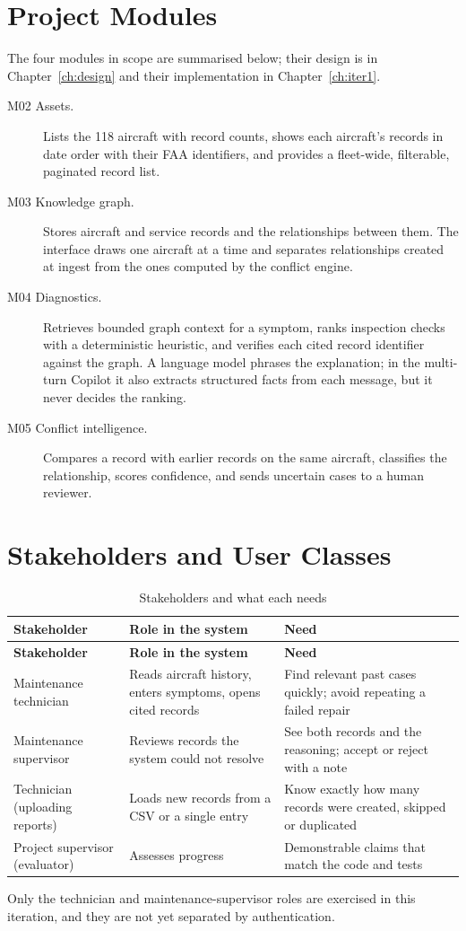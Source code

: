 \section{Project Modules}
The four modules in scope are summarised below; their design is in Chapter~\ref{ch:design} and their implementation in Chapter~\ref{ch:iter1}.

\begin{description}
\item[M02 Assets.] Lists the 118 aircraft with record counts, shows each aircraft's records in date order with their FAA identifiers, and provides a fleet-wide, filterable, paginated record list.
\item[M03 Knowledge graph.] Stores aircraft and service records and the relationships between them. The interface draws one aircraft at a time and separates relationships created at ingest from the ones computed by the conflict engine.
\item[M04 Diagnostics.] Retrieves bounded graph context for a symptom, ranks inspection checks with a deterministic heuristic, and verifies each cited record identifier against the graph. A language model phrases the explanation; in the multi-turn Copilot it also extracts structured facts from each message, but it never decides the ranking.
\item[M05 Conflict intelligence.] Compares a record with earlier records on the same aircraft, classifies the relationship, scores confidence, and sends uncertain cases to a human reviewer.
\end{description}

\section{Stakeholders and User Classes}
\begin{longtable}{p{}p{}p{}}
\caption{Stakeholders and what each needs}\label{tab:stakeholders}\\
\toprule
\textbf{Stakeholder} & \textbf{Role in the system} & \textbf{Need} \\ \midrule \endfirsthead
\toprule \textbf{Stakeholder} & \textbf{Role in the system} & \textbf{Need} \\ \midrule \endhead
Maintenance technician & Reads aircraft history, enters symptoms, opens cited records & Find relevant past cases quickly; avoid repeating a failed repair \\
Maintenance supervisor & Reviews records the system could not resolve & See both records and the reasoning; accept or reject with a note \\
Technician (uploading reports) & Loads new records from a CSV or a single entry & Know exactly how many records were created, skipped or duplicated \\
Project supervisor (evaluator) & Assesses progress & Demonstrable claims that match the code and tests \\
\bottomrule
\end{longtable}
Only the technician and maintenance-supervisor roles are exercised in this iteration, and they are not yet separated by authentication.

